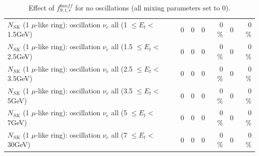 \begin{table}
\begin{tabular}{| l | r | r | r  r | r  r |}
$N_{SK}$ (1 $\mu$-like ring): oscillation $\nu_{e}$ all (1 $\leq E_{t} <$ 1.5GeV) &               0 &               0 &               0 &        0 \%  &               0 &        0 \%  \\ 
$N_{SK}$ (1 $\mu$-like ring): oscillation $\nu_{e}$ all (1.5 $\leq E_{t} <$ 2.5GeV) &               0 &               0 &               0 &        0 \%  &               0 &        0 \%  \\ 
$N_{SK}$ (1 $\mu$-like ring): oscillation $\nu_{e}$ all (2.5 $\leq E_{t} <$ 3.5GeV) &               0 &               0 &               0 &        0 \%  &               0 &        0 \%  \\ 
$N_{SK}$ (1 $\mu$-like ring): oscillation $\nu_{e}$ all (3.5 $\leq E_{t} <$ 5GeV) &               0 &               0 &               0 &        0 \%  &               0 &        0 \%  \\ 
 $N_{SK}$ (1 $\mu$-like ring): oscillation $\nu_{e}$ all (5 $\leq E_{t} <$ 7GeV) &               0 &               0 &               0 &        0 \%  &               0 &        0 \%  \\ 
$N_{SK}$ (1 $\mu$-like ring): oscillation $\nu_{e}$ all (7 $\leq E_{t} <$ 30GeV) &               0 &               0 &               0 &        0 \%  &               0 &        0 \%  \\ 
\hline
\hline
\end{tabular}
\caption{ Effect of $f_{9; t, r}^{banff}$ for no oscillations (all mixing parameters set to 0). }
\label{tab:num_banff_09_1RmuT_3f_osc_t13:0}
\end{table}
\clearpage
